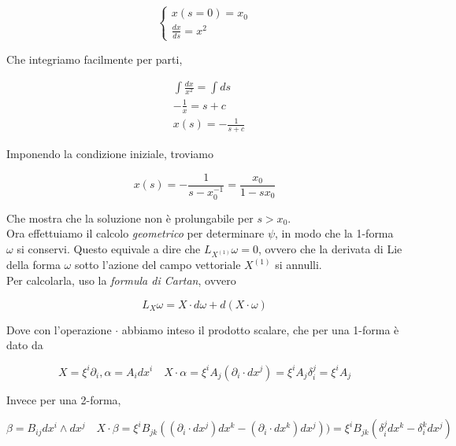 \documentclass{report}
\begin{document}
\[\begin{cases}
    x(s=0) = x_0 \\
    \frac{dx}{ds} = x^2 
\end{cases} \]

Che integriamo facilmente per parti, 

\begin{align}
    &\int \frac{dx}{x^2} = \int ds \\
    & -\frac{1}{x} = s + c \\
    & x(s) = - \frac{1}{s +c}
\end{align}

Imponendo la condizione iniziale, troviamo 

\begin{equation}
    x(s) = -\frac{1}{s - x_0^{-1}} = \frac{x_0}{1 - sx_0}
\end{equation}

Che mostra che la soluzione non è prolungabile per $s > x_0$. \\

Ora effettuiamo il calcolo \emph{geometrico} per determinare $\psi$, in modo che la 1-forma $\omega$ si conservi. Questo equivale a dire che $L_{X^{(1)}}\omega = 0$, ovvero che la derivata di Lie della forma $\omega$ sotto l'azione del campo vettoriale $X^{(1)}$ si annulli. \\

Per calcolarla, uso la \emph{formula di Cartan}, ovvero 

\begin{tcolorbox}[colback=doc!10, colframe=black, boxrule=1pt]
\begin{equation}
    \label{Cartan_formula}
    L_{X}\omega = X \cdot d\omega + d(X \cdot \omega)
\end{equation}
\end{tcolorbox}

Dove con l'operazione $\cdot $ abbiamo inteso il prodotto scalare, che per una 1-forma è dato da 

\begin{equation}
    X = \xi^i\partial_i , \alpha = A_idx^i \quad X \cdot \alpha  = \xi^iA_j(\partial_i \cdot dx^j) = \xi^iA_j \delta _i^j = \xi^iA_j 
\end{equation}

Invece per una 2-forma, 

\begin{equation}
    \beta = B_{ij}dx^i \wedge dx^j \quad X \cdot \beta = \xi^iB_{jk}((\partial_i \cdot dx^j)dx^k - (\partial_i\cdot dx^k)dx^j)) = \xi^iB_{jk}(\delta_i^jdx^k - \delta_i^kdx^j)
\end{equation}
\end{document}
